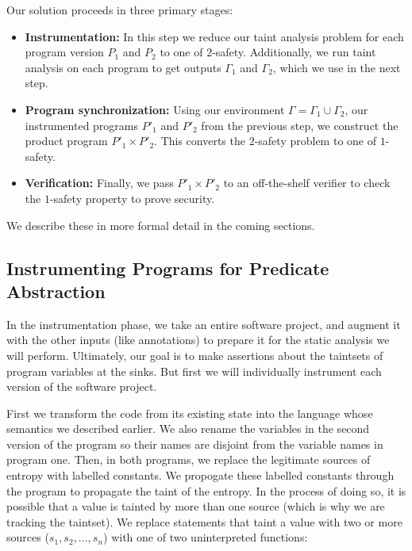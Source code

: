 \documentclass[letterpaper,twocolumn,10pt]{article}
\begin{document}
Our solution proceeds in three primary stages:

\begin{itemize}
    \item \textbf{Instrumentation:} In this step we reduce our taint analysis problem for each program version $P_1$ and $P_2$ to one of $2$-safety.
    Additionally, we run taint analysis on each program to get outputs $\Gamma_1$ and $\Gamma_2$, which we use in the next step.
    \item \textbf{Program synchronization:} Using our environment $\Gamma = \Gamma_1 \cup \Gamma_2$, our instrumented programs $P'_1$ and $P'_2$ from 
    the previous step, we construct the product program $P'_1 \times P'_2$. This converts the $2$-safety problem to one of $1$-safety.
    \item \textbf{Verification:} Finally, we pass $P'_1 \times P'_2$ to an off-the-shelf verifier to check the $1$-safety property to
    prove security.
\end{itemize}

We describe these in more formal detail in the coming sections.

\subsection{Instrumenting Programs for Predicate Abstraction}


	In the instrumentation phase, we take an entire software project, and augment it with the other inputs (like annotations) to prepare it for the static analysis we will perform. Ultimately, our goal is to make assertions about the taintsets of program variables at the sinks. But first we will individually instrument each version of the software project.

	First we transform the code from its existing state into the language whose semantics we described earlier. We also rename the variables in the second version of the program so their names are disjoint from the variable names in program one. Then, in both programs, we replace the legitimate sources of entropy with labelled constants. We propogate these labelled constants through the program to propagate the taint of the entropy. In the process of doing so, it is possible that a value is tainted by more than one source (which is why we are tracking the taintset). We replace statements that taint a value with two or more sources ($s_1, s_2, \ldots, s_n$) with one of two uninterpreted functions: 
\end{document}

